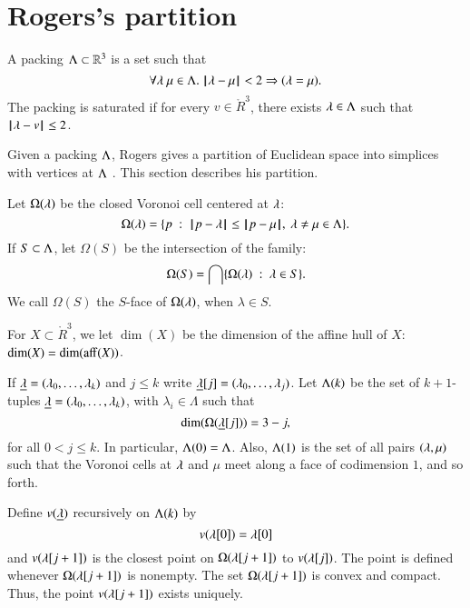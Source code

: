 \section{Rogers's partition}

\begin{definition}
A packing $\Lambda\subset \mathbb{R}^3$ is a set such that
$$\forall \lambda~\mu\in \Lambda.~  {\hskip0.1em|\hskip-0.15em|\hskip0.1em}\lambda - \mu{\hskip0.1em|\hskip-0.15em|\hskip0.1em} < 2 \Rightarrow (\lambda=\mu).$$
The packing is saturated if for every $v\in\ring{R}^3$,   there exists $\lambda\in\Lambda$
such that ${\hskip0.1em|\hskip-0.15em|\hskip0.1em}\lambda - v{\hskip0.1em|\hskip-0.15em|\hskip0.1em}\le 2$.
\end{definition}


Given a packing $\Lambda$, Rogers gives a partition of Euclidean space into
simplices with vertices at $\Lambda$ \cite{Rogers:1958:Packing}.   This section describes his partition.

Let $\Omega(\lambda)$  be the closed Voronoi cell centered at $\lambda$:
$$
  \Omega(\lambda) = \{p \ :\   {\hskip0.1em|\hskip-0.15em|\hskip0.1em}p - \lambda{\hskip0.1em|\hskip-0.15em|\hskip0.1em} 
\le {\hskip0.1em|\hskip-0.15em|\hskip0.1em}p - \mu{\hskip0.1em|\hskip-0.15em|\hskip0.1em},\ \lambda\ne\mu\in\Lambda\}.
$$
If $S\subset\Lambda$, let $\Omega(S)$ be the intersection of the family:
$$\Omega(S)  = \bigcap \{\Omega(\lambda)\ :\  \lambda\in S \}.$$
We call $\Omega(S)$ the $S$-face of $\Omega(\lambda)$, when $\lambda\in S$.

For $X\subset\ring{R}^3$, we let $\dim(X)$ be the dimension of the affine hull
of $X$: $\dim(X) = \dim({\operatorname{aff}}(X))$.

If ${\underline{\lambda}}=(\lambda_0,\ldots,\lambda_k)$ and $j\le k$ write ${\underline{\lambda}}[j] = (\lambda_0,\ldots,\lambda_j)$.
Let $\Lambda(k)$ be the set of $k+1$-tuples ${\underline{\lambda}}=(\lambda_0,\ldots,\lambda_k)$, with
$\lambda_i\in\Lambda$ such
that 
\begin{equation}\label{eqn:omega-dim}
\dim(\Omega({\underline{\lambda}}[j])) = 3-j,
\end{equation}
for all $0<j\le k$.
In particular, $\Lambda(0)=\Lambda$.  Also, $\Lambda(1)$ is the
set of all pairs $(\lambda,\mu)$ such that the Voronoi cells at $\lambda$ and $\mu$ meet along
a face of codimension $1$, and
so forth.


Define $v({\underline{\lambda}})$ recursively on $\Lambda(k)$ by
$$v(\lambda[0]) = \lambda[0]$$
and $v(\lambda[j+1])$ is the closest point on $\Omega(\lambda[j+1])$ to $v(\lambda[j])$.  The point is defined whenever $\Omega(\lambda[j+1])$ is nonempty.
The set $\Omega(\lambda[j+1])$ is convex and compact.  Thus, the point $v(\lambda[j+1])$ exists
uniquely.

